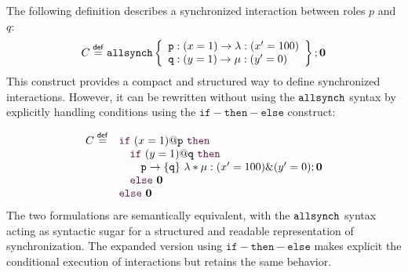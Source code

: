 \begin{example}\label{example3}
  The following definition describes a synchronized interaction between roles $p$ and $q$:
  \begin{displaymath}
    \begin{array}{lll}
      C \stackrel{\mathsf{def}}{=} \mathtt{allsynch}\left\{
      \begin{array}{lll}
        \mathtt{p} : (x=1) \rightarrow \lambda : (x'=100)
        \\
        \mathtt{q} : (y=1) \rightarrow \mu : (y'=0)
      \end{array}
      \right\} ; \mathbf{0}
    \end{array}
  \end{displaymath}
  This construct provides a compact and structured way to define synchronized interactions. However, it can be rewritten without using the $\mathtt{allsynch}$ syntax by explicitly handling conditions using the $\mathtt{if-then-else}$ construct:


\begin{displaymath}
  \begin{array}{ll}
C \stackrel{\mathsf{def}}{=}& \textcolor{sh_keyword}{\mathtt{if}}\ (x=1)@\role {p}\ \textcolor{sh_keyword}{\mathtt{then}}\\ 
& \quad \textcolor{sh_keyword}{\mathtt{if}}\ (y=1)@\role {q}\ \textcolor{sh_keyword}{\mathtt{then}}\\
& \quad \quad \interactBase{p}{q}\ \lambda*\mu: (x'=100)\&(y'=0);\CEnd \\
& \quad \textcolor{sh_keyword}{\mathtt{else}}\ \CEnd \\
& \textcolor{sh_keyword}{\mathtt{else}}\ \CEnd
  \end{array}
\end{displaymath}
The two formulations are semantically equivalent, with the $\mathtt{allsynch}$ syntax acting as syntactic sugar for a structured and readable representation of synchronization. The expanded version using $\mathtt{if-then-else}$ makes explicit the conditional execution of interactions but retains the same behavior.
\end{example}




